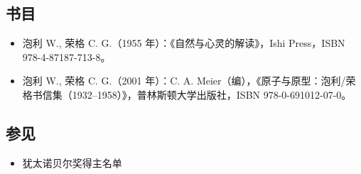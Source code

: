 \subsection{书目}  
\begin{itemize}
\item 泡利 W., 荣格 C. G.（1955 年）：《自然与心灵的解读》，Ishi Press，ISBN 978-4-87187-713-8。  
\item 泡利 W., 荣格 C. G.（2001 年）：C. A. Meier（编），《原子与原型：泡利/荣格书信集（1932–1958）》，普林斯顿大学出版社，ISBN 978-0-691012-07-0。  
\end{itemize}
\subsection{参见}  
\begin{itemize}
\item 犹太诺贝尔奖得主名单
\end{itemize}
